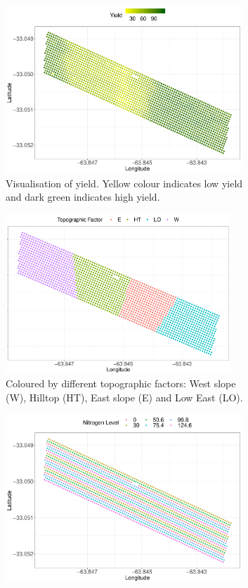 \documentclass[a4paper]{article}   	%
\begin{document}
	
	\begin{figure}[!htp]
		\centering	
		\begin{subfigure}[t]{0.45\textwidth}
			\centering
			\includegraphics[height=6.3cm,width=\linewidth]{Images/lasrossa_view01}
			\caption{Visualisation of yield. Yellow colour indicates low yield and dark green indicates high yield.}\label{fig:lasrossayield}
		\end{subfigure}
		\space
		\begin{subfigure}[t]{0.45\textwidth}
			\centering
			\includegraphics[height=6.0cm,width=0.9\linewidth]{Images/lasrossa_view02}
			\caption{Coloured by different topographic factors: West slope (W), Hilltop (HT), East slope (E) and Low East (LO).}\label{fig:lasrossascatter}
		\end{subfigure}
		\begin{subfigure}[t]{0.45\textwidth}
			\centering
			\includegraphics[height=6.3cm,width=\linewidth]{Images/lasrossa_view06}

\end{subfigure}
\end{figure}
\end{document}
